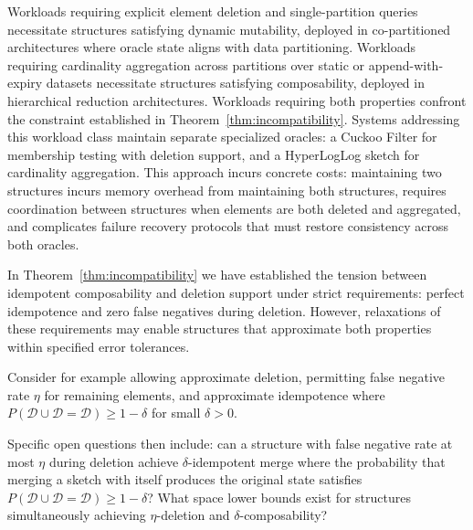 Workloads requiring explicit element deletion and single-partition queries necessitate structures satisfying dynamic mutability, deployed in co-partitioned architectures where oracle state aligns with data partitioning. Workloads requiring cardinality aggregation across partitions over static or append-with-expiry datasets necessitate structures satisfying composability, deployed in hierarchical reduction architectures. Workloads requiring both properties confront the constraint established in Theorem~\ref{thm:incompatibility}. Systems addressing this workload class maintain separate specialized oracles: a Cuckoo Filter for membership testing with deletion support, and a HyperLogLog sketch for cardinality aggregation. This approach incurs concrete costs: maintaining two structures incurs memory overhead from maintaining both structures, requires coordination between structures when elements are both deleted and aggregated, and complicates failure recovery protocols that must restore consistency across both oracles.

In Theorem~\ref{thm:incompatibility} we have established the tension between idempotent composability and deletion support under strict requirements: perfect idempotence and zero false negatives during deletion. However, relaxations of these requirements may enable structures that approximate both properties within specified error tolerances.

Consider for example allowing approximate deletion, permitting false negative rate $\eta$ for remaining elements, and approximate idempotence where $P(\mathcal{D} \cup \mathcal{D} = \mathcal{D}) \geq 1 - \delta$ for small $\delta > 0$.

Specific open questions then include: can a structure with false negative rate at most $\eta$ during deletion achieve $\delta$-idempotent merge where the probability that merging a sketch with itself produces the original state satisfies $P(\mathcal{D} \cup \mathcal{D} = \mathcal{D}) \geq 1 - \delta$? What space lower bounds exist for structures simultaneously achieving $\eta$-deletion and $\delta$-composability?

